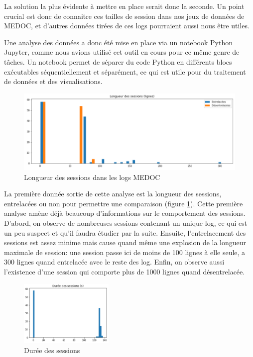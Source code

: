 \documentclass[openany, 11pt]{memoir}
\begin{document}
La solution la plus évidente à mettre en place serait donc la seconde. Un point crucial est donc de connaitre ces tailles de session dans nos jeux de données de \gls{MEDOC}, et d'autres données tirées de ces \glspl{log} pourraient aussi nous être utiles.

\bigskip
Une analyse des données a donc été mise en place via un notebook Python Jupyter, comme nous avions utilisé cet outil en cours pour ce même genre de tâches. Un notebook permet de séparer du code Python en différents blocs exécutables séquentiellement et séparément, ce qui est utile pour du traitement de données et des visualisations.

\begin{figure}[ht]
	\centering
	\includegraphics[width=\textwidth]{images/longsess.png}
	\caption{Longueur des sessions dans les logs MEDOC}
	\label{longsess}
\end{figure}

La première donnée sortie de cette analyse est la longueur des sessions, entrelacées ou non pour permettre une comparaison (figure \ref{longsess}). Cette première analyse amène déjà beaucoup d'informations sur le comportement des sessions. D'abord, on observe de nombreuses sessions contenant un unique \gls{log}, ce qui est un peu suspect et qu'il faudra étudier par la suite. Ensuite, l'entrelacement des sessions est assez minime mais cause quand même une explosion de la longueur maximale de session: une session passe ici de moins de 100 lignes à elle seule, a 300 lignes quand entrelacée avec le reste des \gls{log}. Enfin, on observe aussi l'existence d'une session qui comporte plus de 1000 lignes quand désentrelacée.

\begin{figure}[ht]
	\centering
	\includegraphics[width=0.4\textwidth]{images/dureesess.png}
	\caption{Durée des sessions}
	\label{dureesess}
\end{figure}
\end{document}
